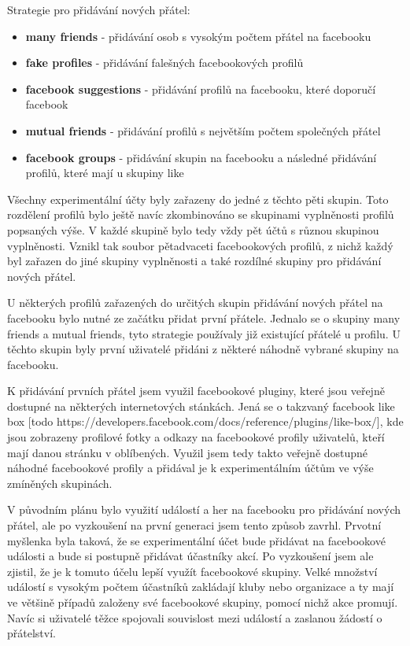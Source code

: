 \documentclass[thesis=M,czech]{FITthesis}[2013/05/10]
\begin{document}
Strategie pro přidávání nových přátel:

\begin{itemize}
  \item \textbf{many friends} - přidávání osob s vysokým počtem přátel na facebooku
  \item \textbf{fake profiles} - přidávání falešných facebookových profilů
  \item \textbf{facebook suggestions} - přidávání profilů na facebooku, které doporučí facebook 
  \item \textbf{mutual friends} - přidávání profilů s největším počtem společných přátel
  \item \textbf{facebook groups} - přidávání skupin na facebooku a následné přidávání profilů, které mají u skupiny like
\end{itemize}

Všechny experimentální účty byly zařazeny do jedné z těchto pěti skupin. Toto rozdělení profilů bylo ještě navíc zkombinováno se skupinami vyplněnosti profilů popsaných výše. V každé skupině bylo tedy vždy pět účtů s různou skupinou vyplněnosti. Vznikl tak soubor pětadvaceti facebookových profilů, z nichž každý byl zařazen do jiné skupiny vyplněnosti a také rozdílné skupiny pro přidávání nových přátel.

U některých profilů zařazených do určitých skupin přidávání nových přátel na facebooku bylo nutné ze začátku přidat první přátele. Jednalo se o skupiny many friends a mutual friends, tyto strategie používaly již existující přátelé u profilu. U těchto skupin byly první uživatelé přidáni z některé náhodně vybrané skupiny na facebooku. 

K přidávání prvních přátel jsem využil facebookové pluginy, které jsou veřejně dostupné na některých internetových stánkách. Jená se o takzvaný facebook like box [todo https://developers.facebook.com/docs/reference/plugins/like-box/], kde jsou zobrazeny profilové fotky a odkazy na facebookové profily uživatelů, kteří mají danou stránku v oblíbených. Využil jsem tedy takto veřejně dostupné náhodné facebookové profily a přidával je k experimentálním účtům ve výše zmíněných skupinách.

V původním plánu bylo využití událostí a her na facebooku pro přidávání nových přátel, ale po vyzkoušení na první generaci jsem tento způsob zavrhl. Prvotní myšlenka byla taková, že se experimentální účet bude přidávat na facebookové události a bude si postupně přidávat účastníky akcí. Po vyzkoušení jsem ale zjistil, že je k tomuto účelu lepší využít facebookové skupiny. Velké množství událostí s vysokým počtem účastníků zakládají kluby nebo organizace a ty mají ve většině případů založeny své facebookové skupiny, pomocí nichž akce promují. Navíc si uživatelé těžce spojovali souvislost mezi událostí a zaslanou žádostí o přátelství.
\end{document}
